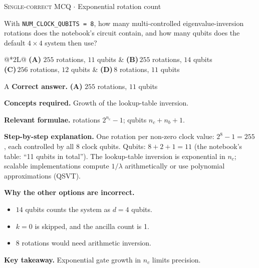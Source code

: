 \documentclass[11pt,a4paper]{article}
\newcommand{\optlabel}[1]{\textbf{(#1)}}
\newcommand{\correctlabel}[1]{\textcolor{okgreen}{\textbf{(#1)}\,\ding{51}}}
\newenvironment{qitem}[1]{\begin{list}{}{\setlength{\leftmargin}{3.3em}\setlength{\labelwidth}{3.1em}%
  \setlength{\labelsep}{0.2em}\setlength{\topsep}{3pt}\setlength{\parsep}{3pt}}\item[\textbf{Q.#1}\hfill]}{\end{list}}
\newcommand{\qsep}{\par\vspace{2pt}{\color{black!15}\hrule}\vspace{4pt}}
\newcommand{\qmeta}[2]{{\footnotesize\color{black!60}\textsc{#1} \;$\cdot$\; #2}\par}
\begin{document}
\begin{qitem}{65}
\qmeta{Single-correct MCQ}{Exponential rotation count}
With \texttt{NUM\_CLOCK\_QUBITS = 8}, how many multi-controlled eigenvalue-inversion rotations does the notebook's circuit contain, and how many qubits does the
default $4\times4$ system then use?
\par\smallskip\noindent\begin{tabularx}{\linewidth}{@{}*{2}{L}@{}}
\correctlabel{A}\,$255$ rotations, $11$ qubits & \optlabel{B}\,$255$ rotations, $14$ qubits \\[3pt]
\optlabel{C}\,$256$ rotations, $12$ qubits & \optlabel{D}\,$8$ rotations, $11$ qubits
\end{tabularx}
\end{qitem}
\begin{solbox}{A}
\textbf{\color{brand}Correct answer.} \textcolor{okgreen}{\textbf{(A)}} $255$ rotations, $11$ qubits

\textbf{\color{brand}Concepts required.} Growth of the lookup-table inversion.

\textbf{\color{brand}Relevant formulae.} rotations $2^{n_c} - 1$; qubits $n_c + n_b + 1$.

\textbf{\color{brand}Step-by-step explanation.} One rotation per non-zero clock value: $2^8 - 1 = 255$, each controlled by all 8 clock qubits. Qubits: $8 + 2 + 1 = 11$ (the notebook's table: ``11 qubits in total''). The lookup-table
inversion is exponential in $n_c$; scalable implementations compute $1/\lambda$ arithmetically or use polynomial approximations (QSVT).

\textbf{\color{brand}Why the other options are incorrect.}
\begin{itemize}[leftmargin=2.4em, itemsep=1pt, topsep=2pt]
\item[\textbf{(B)}] $14$ qubits counts the system as $d = 4$ qubits.
\item[\textbf{(C)}] $k = 0$ is skipped, and the ancilla count is 1.
\item[\textbf{(D)}] $8$ rotations would need arithmetic inversion.
\end{itemize}
\textbf{\color{brand}Key takeaway.} Exponential gate growth in $n_c$ limits precision.
\end{solbox}
\qsep
\end{document}

